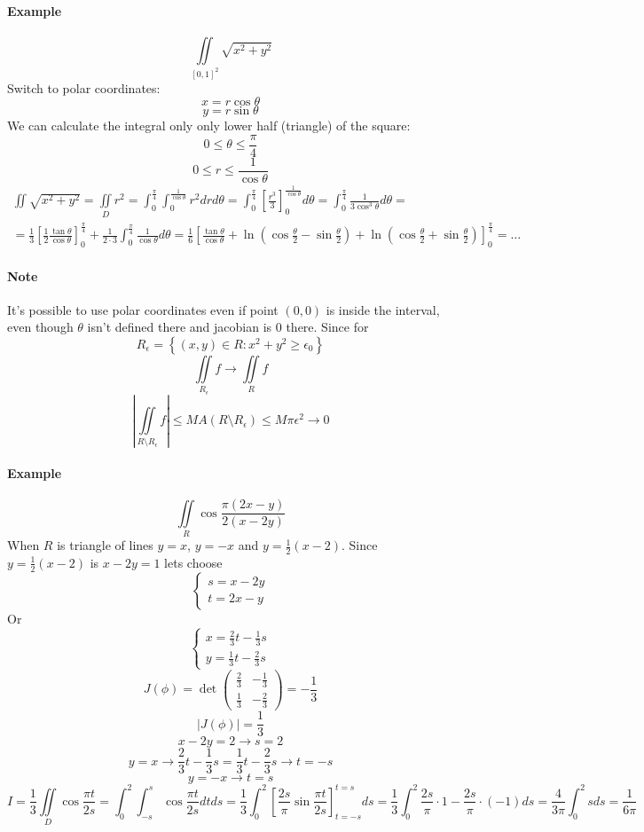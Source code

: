 \paragraph{Example}
$$\iint\limits_{[0,1]^2} \sqrt{x^2+y^2} $$
Switch to polar coordinates:
$$x = r\cos \theta$$
$$y = r \sin \theta$$
We can calculate the integral only only lower half (triangle) of the square:
$$0 \leq \theta \leq \frac{\pi}{4}$$
$$0 \leq r \leq \frac{1}{\cos \theta}$$
\begin{align*}
\iint \sqrt{x^2+y^2} = \iint\limits_{D} r^2 = \int_0^{\frac{\pi}{4}}\int_0^{\frac{1}{\cos \theta}} r^2 dr d\theta = \int_0^{\frac{\pi}{4}} \left[ \frac{r^3}{3} \right]_0^{\frac{1}{\cos \theta}} d\theta = \int_0^{\frac{\pi}{4}} \frac{1}{3\cos^3 \theta} d\theta =\\= \frac{1}{3}\left[ \frac{1}{2}\frac{\tan \theta}{\cos \theta} \right]_{0}^{\frac{\pi}{4}}+ \frac{1}{2\cdot 3} \int_0^{\frac{\pi}{4}} \frac{1}{\cos \theta} d\theta = \frac{1}{6}\left[\frac{\tan \theta}{\cos \theta} +  \ln(\cos \frac{\theta}{2}-\sin \frac{\theta}{2})+\ln(\cos \frac{\theta}{2}+\sin \frac{\theta}{2})\right]_{0}^{\frac{\pi}{4}} = \dots
\end{align*}
\paragraph{Note} It's possible to use polar coordinates even if point $(0,0)$ is inside the interval, even though $\theta$ isn't defined there and jacobian is 0 there. Since for
$$R_\epsilon = \left\{ (x,y)\in R: x^2+y^2 \geq \epsilon_0 \right\}$$
$$\iint\limits_{R_\epsilon} f\to \iint\limits_{R} f$$
$$\left| \iint\limits_{R \setminus R_\epsilon} f\right| \leq MA(R \setminus R_\epsilon) \leq M\pi \epsilon^2 \to 0$$
\paragraph{Example}
$$\iint\limits_{R} \cos \frac{\pi(2x-y)}{2(x-2y)}$$
When $R$ is triangle of lines $y=x$, $y=-x$ and $y=\frac{1}{2}(x-2)$.
Since $y=\frac{1}{2}(x-2)$ is $x-2y=1$ lets choose
$$\begin{cases}
s=x-2y\\t=2x-y
\end{cases}$$
Or
$$\begin{cases}
x=\frac{2}{3}t-\frac{1}{3}s\\y=\frac{1}{3}t-\frac{2}{3}s
\end{cases}$$
$$J(\phi) = \det \begin{pmatrix}\frac{2}{3}&-\frac{1}{3}\\\frac{1}{3}&-\frac{2}{3}\end{pmatrix} = -\frac{1}{3}$$
$$|J(\phi)| = \frac{1}{3}$$
$$x-2y = 2 \rightarrow s=2$$
$$y=x \rightarrow \frac{2}{3}t-\frac{1}{3}s = \frac{1}{3}t-\frac{2}{3}s \rightarrow t=-s$$
$$y=-x \rightarrow t=s$$
$$I = \frac{1}{3}\iint\limits_{D} \cos \frac{\pi t}{2s} = \int_0^2 \int_{-s}^s \cos \frac{\pi t}{2s} dt ds = \frac{1}{3}\int_0^2 \left[ \frac{2s}{\pi}\sin \frac{\pi t}{2s} \right]_{t=-s}^{t=s}ds = \frac{1}{3}\int_0^2 \frac{2s}{\pi}\cdot 1 - \frac{2s}{\pi} \cdot (-1) ds = \frac{4}{3\pi}\int_0^2 s ds = \frac{1}{6\pi}$$
